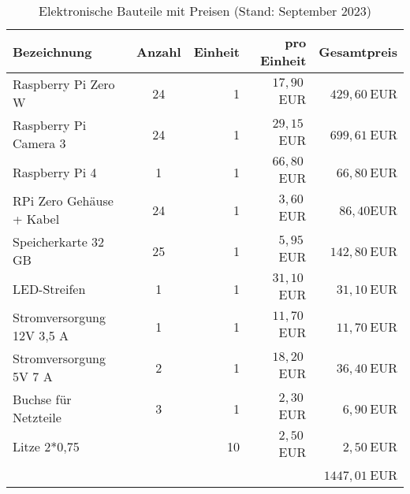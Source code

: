 \documentclass[./00PhotoBox.tex]{subfiles}
\begin{document}
\begin{table}[ht]
    \centering
    \begin{tabular}{l|c|r|r|r}
        Bezeichnung               & Anzahl & Einheit & pro Einheit & Gesamtpreis   \\
        \hline
        Raspberry Pi Zero W       & 24     & 1       & $17,90~$EUR & $429,60~$EUR  \\
        Raspberry Pi Camera 3     & 24     & 1       & $29,15~$EUR & $699,61~$EUR  \\
        Raspberry Pi 4            & 1      & 1       & $66,80~$EUR & $66,80~$EUR   \\
        RPi Zero Gehäuse + Kabel  & 24     & 1       & $3,60~$EUR  & $86,40$EUR    \\
        Speicherkarte 32 GB       & 25     & 1       & $5,95~$EUR  & $142,80~$EUR  \\
        LED-Streifen              & 1      & 1       & $31,10~$EUR & $31,10~$EUR   \\
        Stromversorgung 12V 3,5 A & 1      & 1       & $11,70~$EUR & $11,70~$EUR   \\
        Stromversorgung 5V 7 A    & 2      & 1       & $18,20~$EUR & $36,40~$EUR   \\
        Buchse für Netzteile      & 3      & 1       & $2,30~$EUR  & $6,90~$EUR    \\
        Litze 2*0,75              &        & 10      & $2,50~$EUR  & $2,50~$EUR    \\
                                  &        &         &             & $1447,01~$EUR \\
    \end{tabular}
    \caption{Elektronische Bauteile mit Preisen (Stand: September 2023)}
    \label{tab:bauteile_elektronisch}
\end{table}
\end{document}
